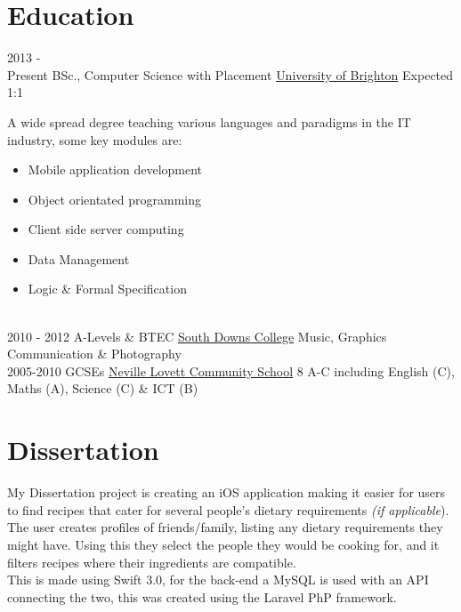 \documentclass[letterpaper]{twentysecondcv} %
\begin{document}
\makeprofile %

\section{Education}

\begin{twenty} %
	\twentyitem
    	{2013 - \\Present}
       	{BSc., Computer Science with Placement}
      	{\href{https://www.brighton.ac.uk/index.aspx}{University of Brighton}}
       	{Expected 1:1}
		{A wide spread degree teaching various languages and paradigms in the IT industry, some key modules are:
       		{\vspace{2mm}
       			\begin{itemize}
       			\setlength\itemsep{.5mm}
			        \item Mobile application development
			        \item Object orientated programming
					 \item Client side server computing
					 \item Data Management
					 \item Logic \& Formal Specification
			    \end{itemize}
			}
        }
	\twentyitem
    	{\\2010 - 2012}
        {A-Levels \& BTEC}
        {\href{http://www.southdowns.ac.uk/}{South Downs College}}
        {}
        {Music, Graphics Communication \& Photography}
    \twentyitem
    	{\\2005-2010}
    	{GCSEs}
    	{\href{https://www.fareham-academy.hants.sch.uk/}{Neville Lovett Community School}}
    	{}
    	{8 A-C including English (C), Maths (A), Science (C) \& ICT (B)}
\end{twenty}

\vspace{-1mm}
\section{Dissertation}
\vspace{-5mm}
\begin{twenty}
	\twentyitem
		{}
		{}
		{}
		{}
		{
			My Dissertation project is creating an iOS application making it easier for users to find recipes that cater for several people's dietary requirements \textit{(if applicable}). The user creates profiles of friends/family, listing any dietary requirements they might have. Using this they select the people they would be cooking for, and it filters recipes where their ingredients are compatible.
			\vspace{2mm}
			\\
			This is made using Swift 3.0, for the back-end a MySQL is used with an API connecting the two, this was created using the Laravel PhP framework.
		}
\end{twenty}
\end{document}
